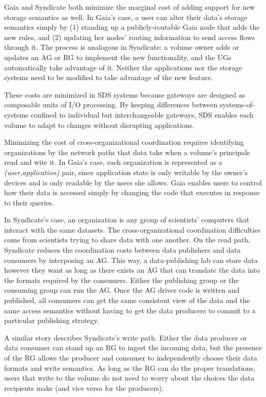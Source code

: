 Gaia and Syndicate both minimize the marginal cost of adding support for new
storage semantics as well.  In Gaia's case, a user can alter their data's
storage semantics simply by (1) standing up a publicly-routable Gaia node that adds the new
rules, and (2) updating her nodes' routing information to send access
flows through it.  The process is analogous in
Syndicate:  a volume owner adds or updates an AG or RG to implement the new
functionality, and the UGs automatically take advantage of it.
Neither the applications nor the
storage systems need to be modified to take advantage of the new
feature.

These costs are minimized in SDS systems because gateways are designed as
composable units of I/O processing.  By keeping
differences between systems-of-systems confined to individual but
interchangeable gateways, SDS enables each volume to adapt to
changes without disrupting applications.

Minimizing the cost of cross-organizational coordination requires identifying
organizations by the network paths that data take when a volume's principals
read and wite it.  In Gaia's case, each organization is represented as a
\textit{(user,application)} pair, since
application state is only writable by the owner's devices and is only readable
by the users she allows.  Gaia enables users to control how their
data is accessed simply by changing the code that executes in response to their queries.

In Syndicate's case, an organization is any group of scientists' computers
that interact with the same datasets.  The cross-organizational coordination
difficulties come from scientists trying to share data with one another.
On the read path, Syndicate reduces the coordination costs between data publishers and data consumers by
interposing an AG.  This way, a data-publishing lab can store data however
they want as long as there exists an AG that can translate the data into the
formats required by the consumers.  Either the publishing group or the consuming
group can run the AG.  Once the AG driver code is written and published,
all consumers can get the same consistent view of the data and the same access
semantics without having to get the data producers to commit to a particular
publishing strategy.

A similar story describes Syndicate's write path.  Either the data producer or data
consumer can stand up an RG to ingest the incoming data, but the presence of the
RG allows the producer and consumer to independently choose their data formats
and write semantics.  As long as the RG can do the proper translations, users
that write to the volume do not need to worry about the choices the data
recipients make (and vice versa for the producers).

